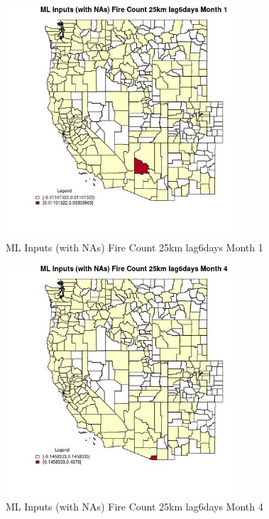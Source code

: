\begin{figure} 
\centering  
\includegraphics[width=0.77\textwidth]{Code_Outputs/Report_ML_input_PM25_Step4_part_e_de_duplicated_aves_compiled_2019-05-21wNAs_CountyFire_Count_25km_lag6daysmedianMonth1.jpg} 
\caption{\label{fig:Report_ML_input_PM25_Step4_part_e_de_duplicated_aves_compiled_2019-05-21wNAsCountyFire_Count_25km_lag6daysmedianMonth1}ML Inputs (with NAs) Fire Count 25km lag6days Month 1} 
\end{figure} 
 

\begin{figure} 
\centering  
\includegraphics[width=0.77\textwidth]{Code_Outputs/Report_ML_input_PM25_Step4_part_e_de_duplicated_aves_compiled_2019-05-21wNAs_CountyFire_Count_25km_lag6daysmedianMonth4.jpg} 
\caption{\label{fig:Report_ML_input_PM25_Step4_part_e_de_duplicated_aves_compiled_2019-05-21wNAsCountyFire_Count_25km_lag6daysmedianMonth4}ML Inputs (with NAs) Fire Count 25km lag6days Month 4} 
\end{figure} 
 

